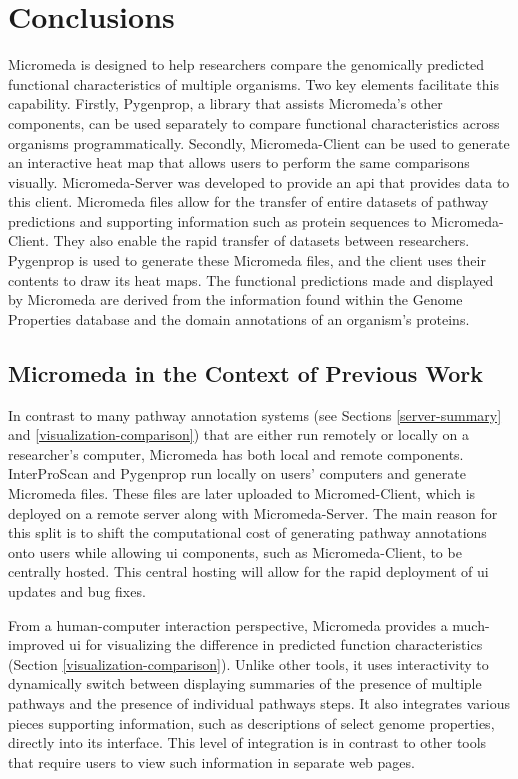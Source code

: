 \chapter{Conclusions} \label{conclusion-chapter}

Micromeda is designed to help researchers compare the genomically predicted functional characteristics of multiple organisms. Two key elements facilitate this capability. Firstly, Pygenprop, a library that assists Micromeda's other components, can be used separately to compare functional characteristics across organisms programmatically. Secondly, Micromeda-Client can be used to generate an interactive heat map that allows users to perform the same comparisons visually. Micromeda-Server was developed to provide an \gls{api} that provides data to this client. Micromeda files allow for the transfer of entire datasets of pathway predictions and supporting information such as protein sequences to Micromeda-Client. They also enable the rapid transfer of datasets between researchers. Pygenprop is used to generate these Micromeda files, and the client uses their contents to draw its heat maps. The functional predictions made and displayed by Micromeda are derived from the information found within the Genome Properties database and the domain annotations of an organism's proteins. 

\section{Micromeda in the Context of Previous Work}

In contrast to many pathway annotation systems (see Sections \ref{server-summary} and \ref{visualization-comparison}) that are either run remotely or locally on a researcher's computer, Micromeda has both local and remote components. InterProScan and Pygenprop run locally on users' computers and generate Micromeda files. These files are later uploaded to Micromed-Client, which is deployed on a remote server along with Micromeda-Server. The main reason for this split is to shift the computational cost of generating pathway annotations onto users while allowing \gls{ui} components, such as Micromeda-Client, to be centrally hosted. This central hosting will allow for the rapid deployment of \gls{ui} updates and bug fixes.

From a human-computer interaction perspective, Micromeda provides a much-improved \gls{ui} for visualizing the difference in predicted function characteristics (Section \ref{visualization-comparison}). Unlike other tools, it uses interactivity to dynamically switch between displaying summaries of the presence of multiple pathways and the presence of individual pathways steps. It also integrates various pieces supporting information, such as descriptions of select genome properties, directly into its interface. This level of integration is in contrast to other tools that require users to view such information in separate web pages.


